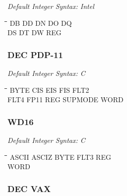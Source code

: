 {\em Default Integer Syntax: Intel}

{\tt\begin{tabbing}
\hspace{3cm}\=\hspace{3cm}\=\hspace{3cm}\=\hspace{3cm}\=\kill
DB         \> DD          \> DN          \> DO          \> DQ \\
DS         \> DT          \> DW          \> REG \\
\end{tabbing}}

\subsubsection{DEC PDP-11}

{\em Default Integer Syntax: C}

{\tt\begin{tabbing}
\hspace{3cm}\=\hspace{3cm}\=\hspace{3cm}\=\hspace{3cm}\=\kill
BYTE       \> CIS         \> EIS         \> FIS         \> FLT2 \\
FLT4       \> FP11        \> REG         \> SUPMODE     \> WORD \\
\end{tabbing}}

\subsubsection{WD16}

{\em Default Integer Syntax: C}

{\tt\begin{tabbing}
\hspace{3cm}\=\hspace{3cm}\=\hspace{3cm}\=\hspace{3cm}\=\kill
ASCII       \> ASCIZ        \>BYTE         \> FLT3        \> REG \\
WORD \\
\end{tabbing}}

\subsubsection{DEC VAX}

